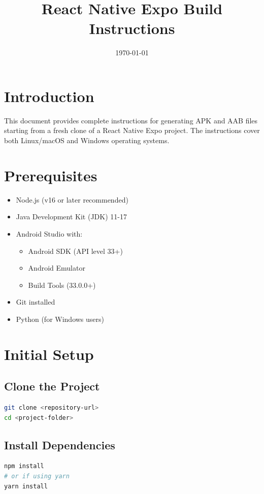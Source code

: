 \documentclass{article}
\title{React Native Expo Build Instructions}
\author{}
\date{\today}
\begin{document}
\maketitle

\section{Introduction}
This document provides complete instructions for generating APK and AAB files starting from a fresh clone of a React Native Expo project. The instructions cover both Linux/macOS and Windows operating systems.

\section{Prerequisites}
\begin{itemize}
    \item Node.js (v16 or later recommended)
    \item Java Development Kit (JDK) 11-17
    \item Android Studio with:
    \begin{itemize}
        \item Android SDK (API level 33+)
        \item Android Emulator
        \item Build Tools (33.0.0+)
    \end{itemize}
    \item Git installed
    \item Python (for Windows users)
\end{itemize}

\section{Initial Setup}

\subsection{Clone the Project}
\begin{lstlisting}[language=bash, caption=Clone the repository]
git clone <repository-url>
cd <project-folder>
\end{lstlisting}

\subsection{Install Dependencies}
\begin{lstlisting}[language=bash, caption=Install dependencies]
npm install
# or if using yarn
yarn install
\end{lstlisting}
\end{document}
